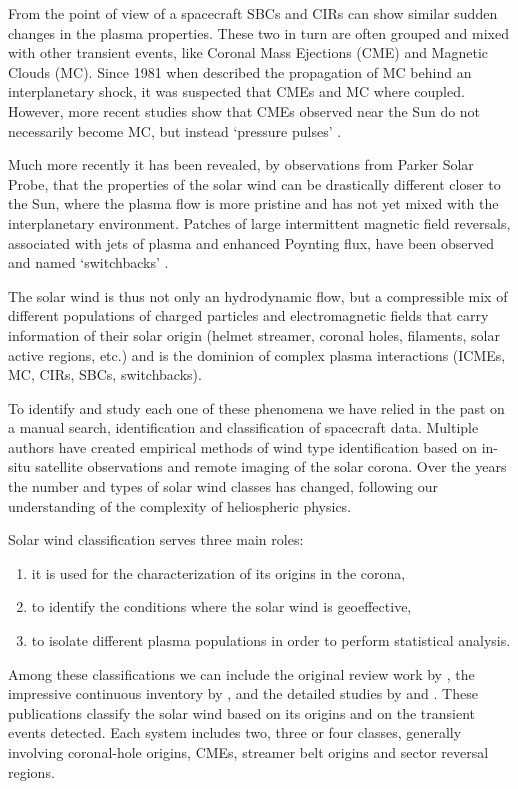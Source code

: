 From the point of view of a spacecraft SBCs and CIRs can show similar sudden changes in the plasma properties. These two in turn are often grouped and mixed with other transient events, like Coronal Mass Ejections (CME) and Magnetic Clouds (MC). Since 1981 when \citep{Burlaga1981} described the propagation of MC behind an interplanetary shock, it was suspected that CMEs and MC where coupled. However, more recent studies show that CMEs observed near the Sun do not necessarily become MC, but instead `pressure pulses' \citep{Gopalswamy1998,Wu2006}.

Much more recently it has been revealed, by observations from Parker Solar Probe, that the properties of the solar wind can be drastically different closer to the Sun, where the plasma flow is more pristine and has not yet mixed with the interplanetary environment. Patches of large intermittent magnetic field reversals, associated with jets of plasma and enhanced Poynting flux, have been observed and named `switchbacks' \citep{Bale2019,Bandyopadhyay2020}.

The solar wind is thus not only an hydrodynamic flow, but a compressible mix of different populations of charged particles and electromagnetic fields that carry information of their solar origin (helmet streamer, coronal holes, filaments, solar active regions, etc.) and is the dominion of complex plasma interactions (ICMEs, MC, CIRs, SBCs, switchbacks).

To identify and study each one of these phenomena we have relied in the past on a manual search, identification and classification of spacecraft data. Multiple authors have created empirical methods of wind type identification based on in-situ satellite observations and remote imaging of the solar corona. Over the years the number and types of solar wind classes has changed, following our understanding of the complexity of heliospheric physics.

Solar wind classification serves three main roles:
\begin{enumerate}
	\item it is used for the characterization of its origins in the corona,
	\item to identify the conditions where the solar wind is geoeffective,
	\item to isolate different plasma populations in order to perform statistical analysis.
\end{enumerate}

Among these classifications we can include the original review work by \citep{Withbroe1986}, the impressive continuous inventory by \citep{Richardson2000,Richardson2010,Richardson2012}, and the detailed studies by \citep{Zhao2009} and \citep{Xu2015b}. These publications classify the solar wind based on its origins and on the transient events detected. Each system includes two, three or four classes, generally involving coronal-hole origins, CMEs, streamer belt origins and sector reversal regions.


